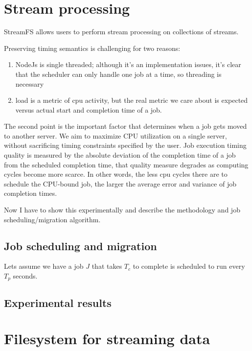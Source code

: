 \documentclass[10pt,print,letterpaper]{sigplan-proc-varsize}
\begin{document}
\section{Stream processing}
StreamFS allows users to perform stream processing on collections of streams.

Preserving timing semantics is challenging for two reasons:

\begin{enumerate}
\item NodeJs is single threaded; although it's an implementation issues, it's clear that
the scheduler can only handle one job at a time, so threading is necessary
\item load is a metric of cpu activity, but the real metric we care about is expected versus
actual start and completion time of a job.
\end{enumerate}

The second point is the important factor that determines when a job gets moved to another server.
We aim to maximize CPU utilization on a single server, without sacrificing timing constraints specified
by the user.  Job execution timing quality is measured by the absolute deviation of the completion
time of a job from the scheduled completion time, that quality measure degrades as computing cycles
become more scarce.  In other words, the less cpu cycles there are to schedule the CPU-bound job, the
larger the average error and variance of job completion times.

Now I have to show this experimentally and describe the methodology and job scheduling/migration algorithm.

\subsection{Job scheduling and migration}
Lets assume we have a job $J$ that takes $T_{c}$ to complete is scheduled to run every $T_{p}$ seconds. 


\subsection{Experimental results}


\section{Filesystem for streaming data}
\end{document}
